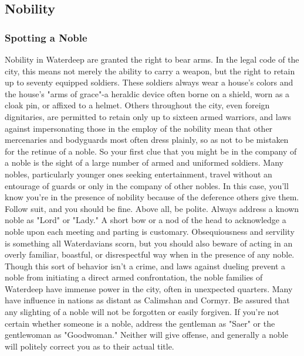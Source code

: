 \documentclass[10pt,a4paper,twoside,twocolumn,openany,nodeprecatedcode]{dndbook}
\begin{document}
\subsection{Nobility}
\subsubsection{Spotting a Noble}
Nobility in Waterdeep are granted the right to bear arms. In the legal code of the city, this means not merely the ability to carry a weapon, but the right to retain up to seventy equipped soldiers. These soldiers always wear a house's colors and the house's "arms of grace"-a heraldic device often borne on a shield, worn as a cloak pin, or affixed to a helmet. Others throughout the city, even foreign dignitaries, are permitted to retain only up to sixteen armed warriors, and laws against impersonating those in the employ of the nobility mean that other mercenaries and bodyguards most often dress plainly, so as not to be mistaken for the retinue of a noble. So your first clue that you might be in the company of a noble is the sight of a large number of armed and uniformed soldiers.
Many nobles, particularly younger ones seeking entertainment, travel without an entourage of guards or only in the company of other nobles. In this case, you'll know you're in the presence of nobility because of the deference others give them. Follow suit, and you should be fine.
Above all, be polite. Always address a known noble as "Lord" or "Lady." A short bow or a nod of the head to acknowledge a noble upon each meeting and parting is customary. Obsequiousness and servility is something all Waterdavians scorn, but you should also beware of acting in an overly familiar, boastful, or disrespectful way when in the presence of any noble. Though this sort of behavior isn't a crime, and laws against dueling prevent a noble from initiating a direct armed confrontation, the noble families of Waterdeep have immense power in the city, often in unexpected quarters. Many have influence in nations as distant as Calimshan and Cormyr. Be assured that any slighting of a noble will not be forgotten or easily forgiven.
If you're not certain whether someone is a noble, address the gentleman as "Saer" or the gentlewoman as "Goodwoman." Neither will give offense, and generally a noble will politely correct you as to their actual title.
\end{document}
